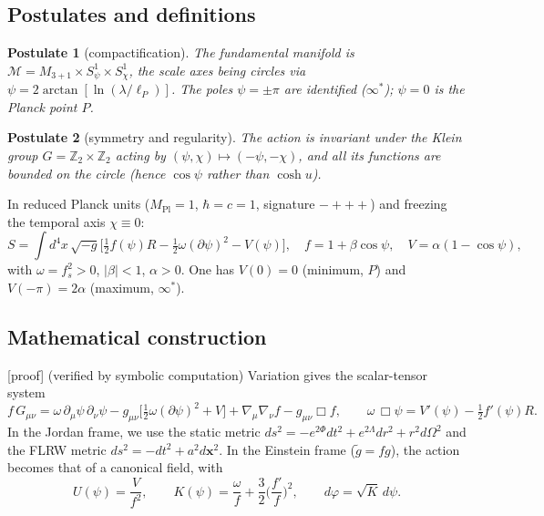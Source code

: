 \documentclass[11pt,a4paper]{article}
\newcommand{\statut}[1]{{\footnotesize\textsf{[#1]}}}
\newcommand{\Mpl}{M_{\mathrm{Pl}}}
\theoremstyle{plain}
\newtheorem{postulate}{Postulate}
\theoremstyle{remark}
\begin{document}
\subsection{Postulates and definitions}
\begin{postulate}[compactification]
The fundamental manifold is $\mathcal{M}=M_{3+1}\times S^1_\psi\times S^1_\chi$, the scale
axes being circles via $\psi=2\arctan[\ln(\lambda/\ell_P)]$. The poles $\psi=\pm\pi$ are
identified ($\infty^*$); $\psi=0$ is the Planck point $P$.
\end{postulate}
\begin{postulate}[symmetry and regularity]
The action is invariant under the Klein group $G=\mathbb{Z}_2\times\mathbb{Z}_2$ acting by
$(\psi,\chi)\mapsto(-\psi,-\chi)$, and all its functions are bounded on the circle (hence
$\cos\psi$ rather than $\cosh u$).
\end{postulate}
In reduced Planck units ($\Mpl=1$, $\hbar=c=1$, signature $-+++$) and freezing the temporal
axis $\chi\equiv0$:
\begin{equation}
S=\int d^4x\,\sqrt{-g}\Big[\tfrac12 f(\psi)R-\tfrac12\omega(\partial\psi)^2-V(\psi)\Big],
\quad f=1+\beta\cos\psi,\quad V=\alpha(1-\cos\psi),
\end{equation}
with $\omega=f_s^2>0$, $|\beta|<1$, $\alpha>0$. One has $V(0)=0$ (minimum, $P$) and
$V(-\pi)=2\alpha$ (maximum, $\infty^*$).

\subsection{Mathematical construction}
\statut{proof} (verified by symbolic computation) Variation gives the scalar-tensor system
\begin{equation}
f\,G_{\mu\nu}=\omega\,\partial_\mu\psi\,\partial_\nu\psi
-g_{\mu\nu}\big[\tfrac12\omega(\partial\psi)^2+V\big]+\nabla_\mu\nabla_\nu f-g_{\mu\nu}\Box f,
\qquad \omega\,\Box\psi=V'(\psi)-\tfrac12 f'(\psi)R.
\end{equation}
In the Jordan frame, we use the static metric
$ds^2=-e^{2\Phi}dt^2+e^{2\Lambda}dr^2+r^2d\Omega^2$ and the FLRW metric
$ds^2=-dt^2+a^2d\mathbf{x}^2$. In the Einstein frame ($\tilde g=f g$), the action becomes
that of a canonical field, with
\begin{equation}
U(\psi)=\frac{V}{f^2},\qquad K(\psi)=\frac{\omega}{f}+\frac32\Big(\frac{f'}{f}\Big)^2,
\qquad d\varphi=\sqrt{K}\,d\psi.
\end{equation}
\end{document}
